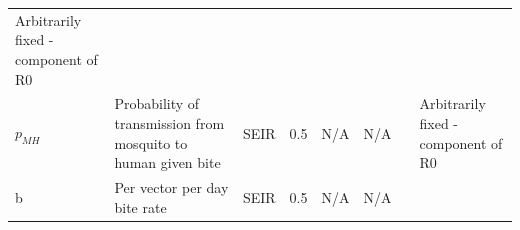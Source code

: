 \documentclass[10pt,letterpaper]{article}
\begin{document}
\begin{longtable}[]{@{}llllllll@{}}
\begin{minipage}[t]{0.26\columnwidth}
Arbitrarily fixed - component of R0\strut
\end{minipage}\tabularnewline
\begin{minipage}[t]{0.04\columnwidth}\raggedright\strut
\(p_{MH}\)\strut
\end{minipage} & \begin{minipage}[t]{0.17\columnwidth}\raggedright\strut
Probability of transmission from mosquito to human given bite\strut
\end{minipage} & \begin{minipage}[t]{0.05\columnwidth}\raggedright\strut
SEIR\strut
\end{minipage} & \begin{minipage}[t]{0.05\columnwidth}\raggedright\strut
0.5\strut
\end{minipage} & \begin{minipage}[t]{0.04\columnwidth}\raggedright\strut
N/A\strut
\end{minipage} & \begin{minipage}[t]{0.04\columnwidth}\raggedright\strut
N/A\strut
\end{minipage} & \begin{minipage}[t]{0.14\columnwidth}\raggedright\strut
\strut
\end{minipage} & \begin{minipage}[t]{0.26\columnwidth}\raggedright\strut
Arbitrarily fixed - component of R0\strut
\end{minipage}\tabularnewline
\begin{minipage}[t]{0.04\columnwidth}\raggedright\strut
b\strut
\end{minipage} & \begin{minipage}[t]{0.17\columnwidth}\raggedright\strut
Per vector per day bite rate\strut
\end{minipage} & \begin{minipage}[t]{0.05\columnwidth}\raggedright\strut
SEIR\strut
\end{minipage} & \begin{minipage}[t]{0.05\columnwidth}\raggedright\strut
0.5\strut
\end{minipage} & \begin{minipage}[t]{0.04\columnwidth}\raggedright\strut
N/A\strut
\end{minipage} & \begin{minipage}[t]{0.04\columnwidth}\raggedright\strut
N/A\strut
\end{minipage} & \begin{minipage}[t]{0.14\columnwidth}\raggedright\strut

\end{minipage}
\end{longtable}
\end{document}
